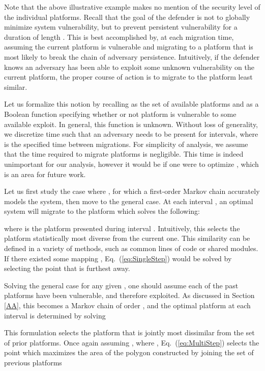 \documentclass{acm_proc_article-sp}
\begin{document}
Note that the above illustrative example makes no mention of the security level of the individual platforms. Recall that the goal of the defender is not to globally minimize system vulnerability, but to prevent persistent vulnerability for a duration of length . This is best accomplished by, at each migration time, assuming the current platform is vulnerable and migrating to a platform that is most likely to break the chain of adversary persistence. Intuitively, if the defender knows an adversary has been able to exploit some unknown vulnerability on the current platform, the proper course of action is to migrate to the platform least similar.

Let us formalize this notion by recalling  as the set of  available platforms and  as a Boolean function specifying whether or not platform  is vulnerable to some available exploit. In general, this function is unknown. Without loss of generality, we discretize time such that an adversary needs to be present for  intervals, where  is the specified time between migrations. For simplicity of analysis, we assume that the time required to migrate platforms is negligible. This time is indeed unimportant for our analysis, however it would be if one were to optimize , which is an area for future work.

Let us first study the case where , for which a first-order Markov chain accurately models the system, then move to the general case. At each interval , an optimal system will migrate to the platform which solves the following:

where  is the platform presented during interval . Intuitively, this selects the platform statistically most diverse from the current one. This similarity can be defined in a variety of methods, such as common lines of code or shared modules. If there existed some mapping , Eq.\ (\ref{eq:SingleStep}) would be solved by selecting the point that is furthest away.

Solving the general case for any given , one should assume each of the past  platforms have been vulnerable, and therefore exploited. As discussed in Section \ref{AA}, this becomes a Markov chain of order , and the optimal platform at each interval  is determined by solving

This formulation selects the platform that is jointly most dissimilar from the set of  prior platforms. Once again assuming , where , Eq.\ (\ref{eq:MultiStep}) selects the point which maximizes the area of the polygon constructed by joining the set of previous platforms
\end{document}
